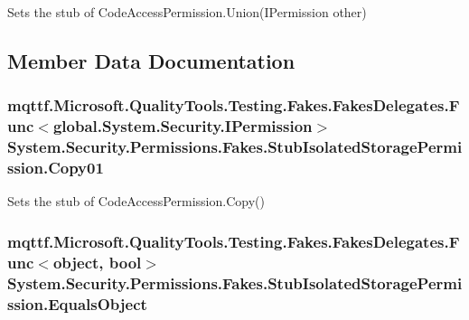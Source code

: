 Sets the stub of Code\-Access\-Permission.\-Union(\-I\-Permission other)



\subsection{Member Data Documentation}
\hypertarget{class_system_1_1_security_1_1_permissions_1_1_fakes_1_1_stub_isolated_storage_permission_ab030f6a63f7d3065b46739a571743c28}{
\subsubsection[{Copy01}]{\setlength{\rightskip}{0pt plus 5cm}mqttf.\-Microsoft.\-Quality\-Tools.\-Testing.\-Fakes.\-Fakes\-Delegates.\-Func$<$global.\-System.\-Security.\-I\-Permission$>$ System.\-Security.\-Permissions.\-Fakes.\-Stub\-Isolated\-Storage\-Permission.\-Copy01}}\label{class_system_1_1_security_1_1_permissions_1_1_fakes_1_1_stub_isolated_storage_permission_ab030f6a63f7d3065b46739a571743c28}


Sets the stub of Code\-Access\-Permission.\-Copy()

\hypertarget{class_system_1_1_security_1_1_permissions_1_1_fakes_1_1_stub_isolated_storage_permission_ad3ad850a2c30839d669831f74013b5ec}{
\subsubsection[{Equals\-Object}]{\setlength{\rightskip}{0pt plus 5cm}mqttf.\-Microsoft.\-Quality\-Tools.\-Testing.\-Fakes.\-Fakes\-Delegates.\-Func$<$object, bool$>$ System.\-Security.\-Permissions.\-Fakes.\-Stub\-Isolated\-Storage\-Permission.\-Equals\-Object}}\label{class_system_1_1_security_1_1_permissions_1_1_fakes_1_1_stub_isolated_storage_permission_ad3ad850a2c30839d669831f74013b5ec}


